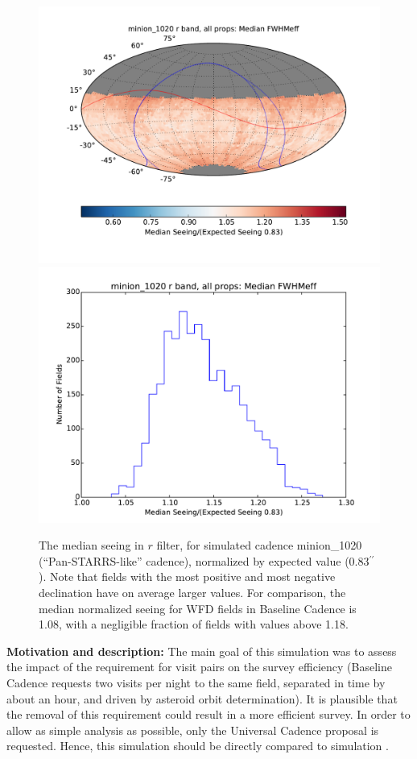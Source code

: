 \begin{figure}[t!]
\vskip -0.03in
\includegraphics[angle=0,width=0.49\hsize:,clip]{figs/cadence/minion_1020_Median_FWHMeff_r_band_all_props_OPSI_SkyMap.pdf}
\includegraphics[angle=0,width=0.49\hsize:,clip]{figs/cadence/minion_1020_Median_FWHMeff_r_band_all_props_OPSI_Histogram.pdf}
\vskip -0.2in
\caption{The median seeing in $r$ filter, for simulated cadence minion\_1020 (``Pan-STARRS-like'' cadence),
normalized by expected value (0.83$^{\prime\prime}$). Note that fields with the most positive and most negative
declination have on average larger values. For comparison, the median normalized seeing for WFD fields
in Baseline Cadence is 1.08, with a negligible fraction of fields with values above 1.18.}
\label{fig:PS-seeing}
\end{figure}




{\bf Motivation and description:} The main goal of this simulation was
to assess the impact of the requirement for visit pairs on the survey
efficiency (Baseline Cadence requests two visits per night to the same
field, separated in time by about an hour, and driven by asteroid
orbit determination). It is plausible that the removal of this
requirement could result in a more efficient survey. In order to allow
as simple analysis as possible, only the Universal Cadence proposal is
requested. Hence, this simulation should be directly compared to
simulation . \\

